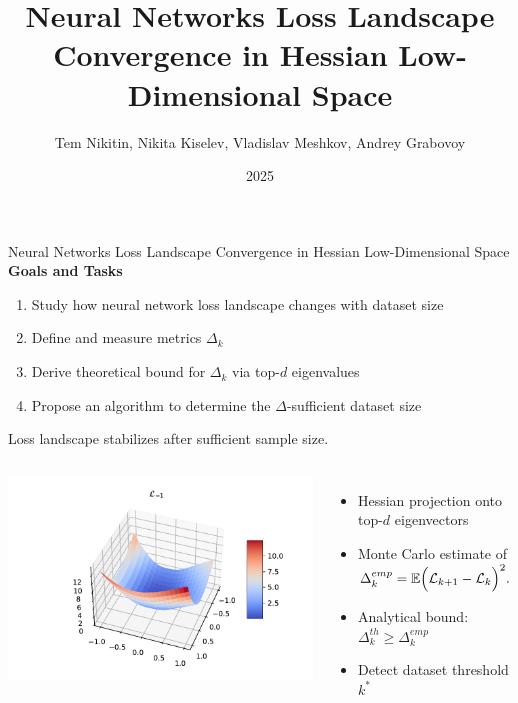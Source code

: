 \documentclass{beamer}
\title[Loss Landscape Convergence]{Neural Networks Loss Landscape Convergence in Hessian Low-Dimensional Space}
\author[Tem Nikitin \textit{et al.}]{Tem Nikitin, Nikita Kiselev, Vladislav Meshkov, Andrey Grabovoy}
\institute{Moscow Institute of Physics and Technology}
\date{2025}
\begin{document}
\begin{frame}
    \thispagestyle{empty}
    \maketitle
\end{frame}

\begin{frame}{Neural Networks Loss Landscape Convergence in Hessian Low-Dimensional Space}
    \textbf{Goals and Tasks}
    \begin{enumerate}
        \item Study how neural network loss landscape changes with dataset size
        \item Define and measure metrics $\Delta_k$
        \item Derive theoretical bound for $\Delta_k$ via top-$d$ eigenvalues
        \item Propose an algorithm to determine the $\Delta$-sufficient dataset size
    \end{enumerate}
\end{frame}

\begin{frame}{Loss landscape stabilizes after sufficient sample size.}
    \begin{columns}[c]
        \hspace{-1.5cm}
        \includegraphics[width=1.34\textwidth]{img/loss_eigen_-1_individ.pdf}
        \begin{itemize}
            \item Hessian projection onto top-$d$ eigenvectors
            \item Monte Carlo estimate of $\Delta_k^{emp} = \mathbb{E} \Bigl( \mathcal{L}_{k+1} - \mathcal{L}_{k} \Bigr)^2.$
            \item Analytical bound: $\Delta_k^{th} \ge \Delta_k^{emp}$
            \item Detect dataset threshold $k^*$
        \end{itemize}
    \end{columns}
\end{frame}
\end{document}

